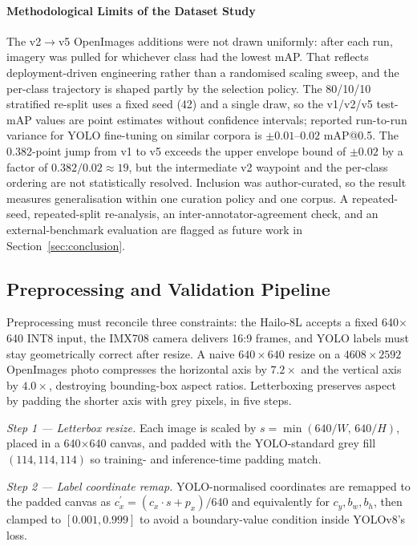 \documentclass{ieeeaccess}
\begin{document}
\paragraph*{Methodological Limits of the Dataset Study}
\label{sec:dataset_limits}
The v2$\rightarrow$v5 OpenImages additions were not drawn uniformly: after each run, imagery was pulled for whichever class had the lowest mAP. That reflects deployment-driven engineering rather than a randomised scaling sweep, and the per-class trajectory is shaped partly by the selection policy. The 80/10/10 stratified re-split uses a fixed seed (42) and a single draw, so the v1/v2/v5 test-mAP values are point estimates without confidence intervals; reported run-to-run variance for YOLO fine-tuning on similar corpora is $\pm 0.01$--$0.02$ mAP{@}0.5. The 0.382-point jump from v1 to v5 exceeds the upper envelope bound of $\pm 0.02$ by a factor of $0.382 / 0.02 \approx 19$, but the intermediate v2 waypoint and the per-class ordering are not statistically resolved. Inclusion was author-curated, so the result measures generalisation within one curation policy and one corpus. A repeated-seed, repeated-split re-analysis, an inter-annotator-agreement check, and an external-benchmark evaluation are flagged as future work in Section~\ref{sec:conclusion}.

\subsection{Preprocessing and Validation Pipeline}
\label{sec:preprocess}
Preprocessing must reconcile three constraints: the Hailo-8L accepts a fixed 640$\times$640 INT8 input, the IMX708 camera delivers 16:9 frames, and YOLO labels must stay geometrically correct after resize. A naive $640\times640$ resize on a $4608\times2592$ OpenImages photo compresses the horizontal axis by $7.2\times$ and the vertical axis by $4.0\times$, destroying bounding-box aspect ratios. Letterboxing preserves aspect by padding the shorter axis with grey pixels, in five steps.

\textit{Step 1 --- Letterbox resize.} Each image is scaled by $s=\min(640/W,\,640/H)$, placed in a 640$\times$640 canvas, and padded with the YOLO-standard grey fill $(114,114,114)$ so training- and inference-time padding match.

\textit{Step 2 --- Label coordinate remap.} YOLO-normalised coordinates are remapped to the padded canvas as $c_x^\prime = (c_x \cdot s + p_x)/640$ and equivalently for $c_y, b_w, b_h$, then clamped to $[0.001, 0.999]$ to avoid a boundary-value condition inside YOLOv8's loss.
\end{document}
